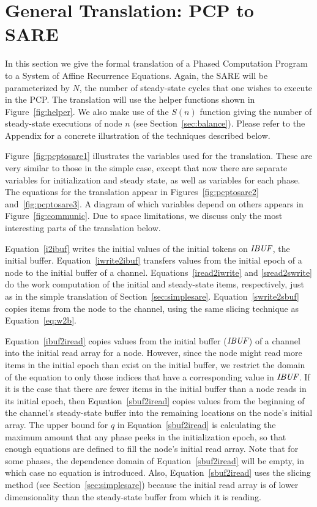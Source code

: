 \section{General Translation: PCP to SARE}
\label{sec:translate}

In this section we give the formal translation of a Phased Computation
Program to a System of Affine Recurrence Equations.  Again, the SARE
will be parameterized by $N$, the number of steady-state cycles that
one wishes to execute in the PCP.  The translation will use the helper
functions shown in Figure~\ref{fig:helper}.  We also make use of the
$S(n)$ function giving the number of steady-state executions of node
$n$ (see Section~\ref{sec:balance}).  Please refer to the Appendix for
a concrete illustration of the techniques described below.



Figure~\ref{fig:pcptosare1} illustrates the variables used for the
translation.  These are very similar to those in the simple case,
except that now there are separate variables for initialization and
steady state, as well as variables for each phase.  The equations for
the translation appear in Figures~\ref{fig:pcptosare2}
and~\ref{fig:pcptosare3}.  A diagram of which variables depend on
others appears in Figure~\ref{fig:communic}.  Due to space
limitations, we discuss only the most interesting parts of the
translation below.

Equation~\ref{i2ibuf} writes the initial values of the initial tokens
on $\mbox{\it IBUF}$, the initial buffer.  Equation~\ref{iwrite2ibuf}
transfers values from the initial epoch of a node to the initial
buffer of a channel.  Equations~\ref{iread2iwrite} and
\ref{sread2swrite} do the work computation of the initial and
steady-state items, respectively, just as in the simple translation of
Section~\ref{sec:simplesare}.  Equation~\ref{swrite2sbuf} copies items
from the node to the channel, using the same slicing technique as
Equation~\ref{eq:w2b}.

Equation~\ref{ibuf2iread} copies values from the initial buffer
($\mbox{\it IBUF}$) of a channel into the initial read array for a node.
However, since the node might read more items in the initial epoch
than exist on the initial buffer, we restrict the domain of the
equation to only those indices that have a corresponding value in
$\mbox{\it IBUF}$.  If it is the case that there are fewer items in the
initial buffer than a node reads in its initial epoch, then
Equation~\ref{sbuf2iread} copies values from the beginning of the
channel's steady-state buffer into the remaining locations on the
node's initial array.  The upper bound for $q$ in
Equation~\ref{sbuf2iread} is calculating the maximum amount that any
phase peeks in the initialization epoch, so that enough equations are
defined to fill the node's initial read array.  Note that for some
phases, the dependence domain of Equation~\ref{sbuf2iread} will be
empty, in which case no equation is introduced.  Also,
Equation~\ref{sbuf2iread} uses the slicing method (see
Section~\ref{sec:simplesare}) because the initial read array is of
lower dimensionality than the steady-state buffer from which it is
reading.

